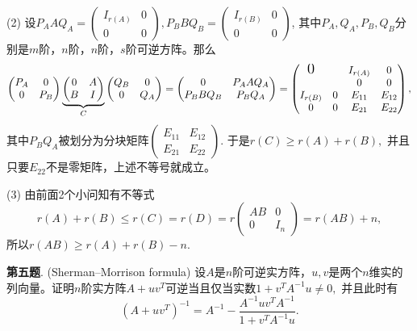 (2) 设$P_A A Q_A = \begin{pmatrix} I_{r(A)} & 0 \\ 0 & 0 \end{pmatrix}, P_B B Q_B = \begin{pmatrix} I_{r(B)} & 0 \\ 0 & 0 \end{pmatrix}$, 其中$P_A, Q_A, P_B, Q_B$分别是$m$阶，$n$阶，$n$阶，$s$阶可逆方阵。那么
$$\begin{pmatrix} P_A & 0 \\ 0 & P_B \end{pmatrix} \underbrace{\begin{pmatrix} 0 & A \\ B & I \end{pmatrix}}_{C} \begin{pmatrix} Q_B & 0 \\ 0 & Q_A \end{pmatrix} = \begin{pmatrix} 0 & P_A A Q_A \\ P_B B Q_B & P_B Q_A \end{pmatrix} = \begin{pmatrix} {\Large \text{0}} & & I_{r(A)} & 0 \\ & & 0 & 0 \\ I_{r(B)} & 0 & E_{11} & E_{12} \\ 0 & 0 & E_{21} & E_{22} \end{pmatrix},$$
其中$P_B Q_A$被划分为分块矩阵$\begin{pmatrix} E_{11} & E_{12} \\ E_{21} & E_{22} \end{pmatrix}.$ 于是$r(C) \geqslant r(A) + r(B),$ 并且只要$E_{22}$不是零矩阵，上述不等号就成立。

(3) 由前面2个小问知有不等式
$$r(A) + r(B) \leqslant r(C) = r(D) = r \begin{pmatrix} AB & 0 \\ 0 & I_n \end{pmatrix} = r(AB) + n,$$
所以$r(AB) \geqslant r(A) + r(B) - n.$

\fi  %

\newpageorvspace

{\bf 第五题}. (Sherman–Morrison formula) 设$A$是$n$阶可逆实方阵，$u, v$是两个$n$维实的列向量。证明$n$阶实方阵$A + uv^T$可逆当且仅当实数$1 + v^TA^{-1}u \neq 0,$ 并且此时有
$$ \left(A + uv^T \right)^{-1} = A^{-1} - \dfrac{ A^{-1}uv^TA^{-1}}{1 + v^TA^{-1}u}.$$

